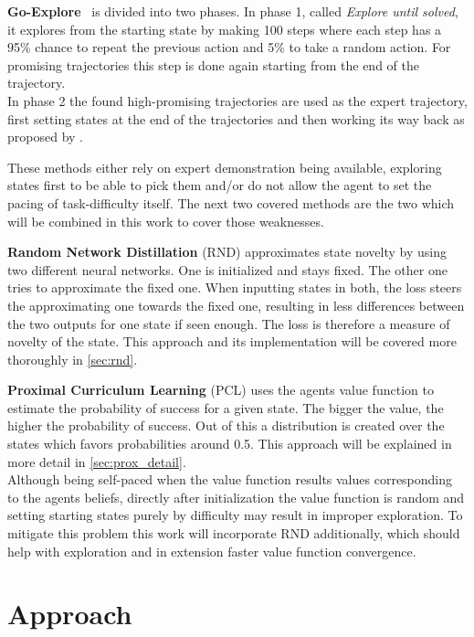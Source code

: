 \documentclass{article}
\begin{document}
\textbf{Go-Explore}~\citep{go_explore} is divided into two phases. In phase 1, called \textit{Explore until solved}, it explores from the starting state by making 100 steps where each step has a 95\% chance to repeat the previous action and 5\% to take a random action. For promising trajectories this step is done again starting from the end of the trajectory.\\
In phase 2 the found high-promising trajectories are used as the expert trajectory, first setting states at the end of the trajectories and then working its way back as proposed by \cite{montezuma_demonstration}.

These methods either rely on expert demonstration being available, exploring states first to be able to pick them and/or do not allow the agent to set the pacing of task-difficulty itself. The next two covered methods are the two which will be combined in this work to cover those weaknesses.

\textbf{Random Network Distillation} (RND) approximates state novelty by using two different neural networks. One is initialized and stays fixed. The other one tries to approximate the fixed one. When inputting states in both, the loss steers the approximating one towards the fixed one, resulting in less differences between the two outputs for one state if seen enough. The loss is therefore a measure of novelty of the state. This approach and its implementation will be covered more thoroughly in \cref{sec:rnd}.

\textbf{Proximal Curriculum Learning} (PCL) uses the agents value function to estimate the probability of success for a given state. The bigger the value, the higher the probability of success. Out of this a distribution is created over the states which favors probabilities around 0.5. This approach will be explained in more detail in \cref{sec:prox_detail}. \\
Although being self-paced when the value function results values corresponding to the agents beliefs, directly after initialization the value function is random and setting starting states purely by difficulty may result in improper exploration. To mitigate this problem this work will incorporate RND additionally, which should help with exploration and in extension faster value function convergence.



\section{Approach}
\label{sec:Approach}
\end{document}
